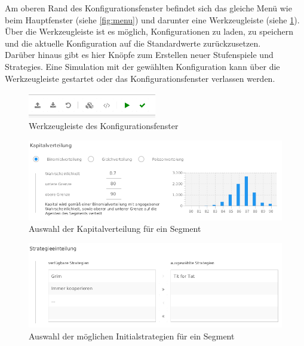 \documentclass[parskip=full,11pt]{scrartcl}
\begin{document}
Am oberen Rand des Konfigurationsfenster befindet sich das gleiche Menü wie beim Hauptfenster (siehe \cref{fig:menu}) und darunter eine Werkzeugleiste (siehe \cref{fig:konfig_tool}). Über die Werkzeugleiste ist es möglich, Konfigurationen zu laden, zu speichern und die aktuelle Konfiguration auf die Standardwerte zurückzusetzen.\\Darüber hinaus gibt es hier Knöpfe zum Erstellen neuer Stufenspiele und \Glspl{Strategie}. Eine Simulation mit der gewählten Konfiguration kann über die Werkzeugleiste gestartet oder das Konfigurationsfenster verlassen werden.

\begin{figure}[hb]
	\centering
	\includegraphics[width=0.5\textwidth]{images/konfig_tool2.png}
	\caption{\label{fig:konfig_tool}
		Werkzeugleiste des Konfigurationsfenster}
\end{figure}

\begin{figure}[hb]
	\centering
	\includegraphics[width=\textwidth]{images/konfig_cap.png}
	\caption{\label{fig:konfig_cap}
		Auswahl der Kapitalverteilung für ein Segment}
\end{figure}

\begin{figure}[hb]
	\centering
	\includegraphics[width=\textwidth]{images/konfig_strat.png}
	\caption{\label{fig:konfig_strat}
		Auswahl der möglichen Initialstrategien für ein Segment}
\end{figure}
\end{document}

